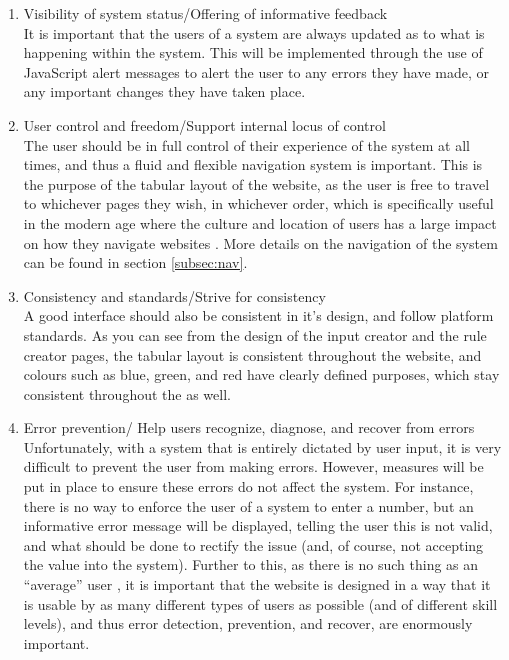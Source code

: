 \begin{enumerate}
\item Visibility of system status/Offering of informative feedback\\
It is important that the users of a system are always updated as to what is happening within the system. This will be implemented through the use of JavaScript alert messages to alert the user to any errors they have made, or any important changes they have taken place.

\item User control and freedom/Support internal locus of control\\
The user should be in full control of their experience of the system at all times, and thus a fluid and flexible navigation system is important. This is the purpose of the tabular layout of the website, as the user is free to travel to whichever pages they wish, in whichever order, which is specifically useful in the modern age where the culture and location of users has a large impact on how they navigate websites \cite{kralisch2005impact}. More details on the navigation of the system can be found in section \ref{subsec:nav}. 

\item Consistency and standards/Strive for consistency\\
A good interface should also be consistent in it's design, and follow platform standards. As you can see from the design of the input creator and the rule creator pages, the tabular layout is consistent throughout the website, and colours such as blue, green, and red have clearly defined purposes, which stay consistent throughout the as well.

\newpage 
\item Error prevention/ Help users recognize, diagnose, and recover from errors\\
Unfortunately, with a system that is entirely dictated by user input, it is very difficult to prevent the user from making errors. However, measures will be put in place to ensure these errors do not affect the system. For instance, there is no way to enforce the user of a system to enter a number, but an informative error message will be displayed, telling the user this is not valid, and what should be done to rectify the issue (and, of course, not accepting the value into the system). Further to this, as there is no such thing as an ``average'' user \cite{partarakis2009user}, it is important that the website is designed in a way that it is usable by as many different types of users as possible (and of different skill levels), and thus error detection, prevention, and recover, are enormously important.


\end{enumerate}
